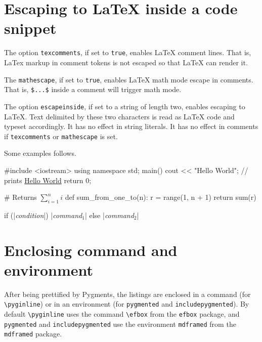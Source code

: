 \documentclass[10pt,a4paper]{article}
\begin{document}
\section{Escaping to \LaTeX{} inside a code snippet}

The option \verb|texcomments|, if set to \texttt{true}, enables \LaTeX{}
comment lines. That is, LaTex markup in comment tokens is not escaped
so that \LaTeX{} can render it.

The \verb|mathescape|, if set to \texttt{true}, enables \LaTeX{} math
mode escape in comments. That is, \verb|$...$| inside a comment will
trigger math mode.

The option \verb|escapeinside|, if set to a string of length two,
enables escaping to \LaTeX{}. Text delimited by these two characters
is read as \LaTeX{} code and typeset accordingly. It has no effect in
string literals. It has no effect in comments if \verb|texcomments| or
\verb|mathescape| is set.

Some examples follows.

\begin{Example}
\begin{pygmented}[lang=c++,texcomments]
#include <iostream>
using namespace std;
main()
{
   cout << "Hello World";  // prints \underline{Hello World}
   return 0;
}
\end{pygmented}
\end{Example}

\begin{Example}
\begin{pygmented}[lang=python,mathescape]
# Returns $\sum_{i=1}^{n}i$
def sum_from_one_to(n):
    r = range(1, n + 1)
    return sum(r)
\end{pygmented}
\end{Example}

\begin{Example}
\begin{pygmented}[lang=c,escapeinside=||]

if (|\textit{condition}|)
    |\textit{command$_1$}|
else
    |\textit{command$_2$}|
\end{pygmented}
\end{Example}


\section{Enclosing command and environment}

After being prettified by Pygments, the listings are enclosed in a
command (for \verb|\pyginline|) or in an environment (for
\verb|pygmented| and \verb|includepygmented|). By default
\verb|\pyginline| uses the command \verb|\efbox| from the \texttt{efbox}
package, and \verb|pygmented| and \verb|includepygmented| use the
environment \verb|mdframed| from the \texttt{mdframed} package.
\end{document}
